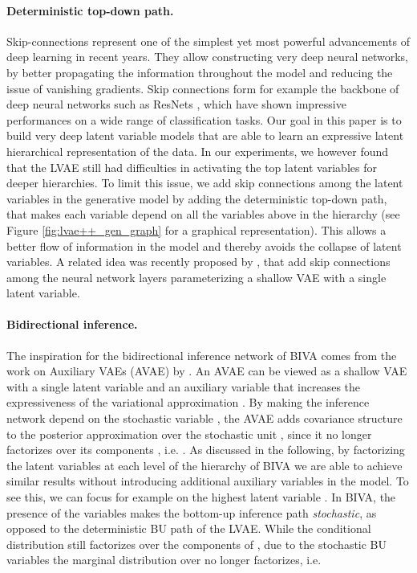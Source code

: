 \documentclass{article}
\def\nm{BIVA\xspace}
\begin{document}
\paragraph{Deterministic top-down path.}
Skip-connections represent one of the simplest yet most powerful advancements of deep learning in recent years.  They allow constructing very deep neural networks, by better propagating the information throughout the model and reducing the issue of vanishing gradients. Skip connections form for example the backbone of deep neural networks such as ResNets \citep{He2015}, which have shown impressive performances on a wide range of classification tasks.
Our goal in this paper is to build very deep latent variable models that are able to learn an expressive latent hierarchical representation of the data. In our experiments, we however found that the LVAE still had difficulties in activating the top latent variables for deeper hierarchies. To limit this issue, we add skip connections among the latent variables in the generative model by adding the deterministic top-down path, that makes each variable depend on all the variables above in the hierarchy (see Figure \ref{fig:lvae++_gen_graph} for a graphical representation). This allows a better flow of information in the model and thereby avoids the collapse of latent variables.
A related idea was recently proposed by \citep{Dieng18}, that add skip connections among the neural network layers parameterizing a shallow VAE with a single latent variable.

\paragraph{Bidirectional inference.}
The inspiration for the bidirectional inference network of \nm comes from the work on Auxiliary VAEs (AVAE) by \citep{Ranganath2015,Maaloe2016}.
An AVAE can be viewed as a shallow VAE with a single latent variable  and an auxiliary variable  that increases the expressiveness of the variational approximation . By making the inference network  depend on the stochastic variable , the AVAE adds covariance structure to the posterior approximation over the stochastic unit , since it no longer factorizes over its components , i.e. .
As discussed in the following, by factorizing the latent variables at each level of the hierarchy of \nm we are able to achieve similar results without introducing additional auxiliary variables in the model. To see this, we can focus for example on the highest latent variable .
In \nm, the presence of the  variables makes the bottom-up inference path \textit{stochastic}, as opposed to the deterministic BU path of the LVAE. 
While the conditional distribution  still factorizes over the components of , due to the stochastic BU variables the marginal distribution over  no longer factorizes, i.e.
\end{document}
